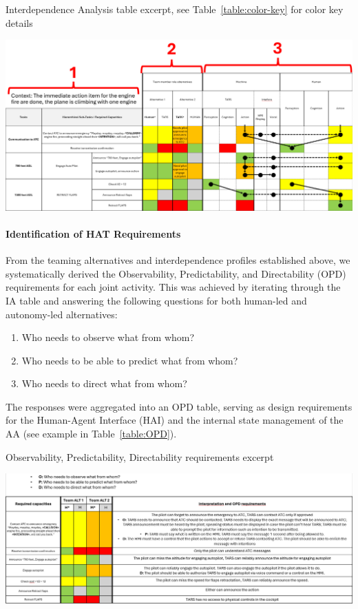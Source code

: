 \documentclass[12pt,a4paper]{article} %
\begin{document}
	\begin{table}[H]
		\centering
		\caption{Interdependence Analysis table excerpt, see Table~\ref{table:color-key} for color key details}
		\includegraphics[width=1\textwidth]{images/IA-table.png}
		\label{table:IA}
	\end{table}

	\paragraph{Identification of HAT Requirements} From the teaming alternatives and interdependence profiles established above, we systematically derived the Observability, Predictability, and Directability (OPD) requirements for each joint activity. This was achieved by iterating through the IA table and answering the following questions for both human-led and autonomy-led alternatives:
	
	\begin{enumerate}
		\item Who needs to observe what from whom?
		\item Who needs to be able to predict what from whom?
		\item Who needs to direct what from whom?
	\end{enumerate}

	The responses were aggregated into an OPD table, serving as design requirements for the Human-Agent Interface (HAI) and the internal state management of the AA (see example in Table~\ref{table:OPD}).

	\begin{table}[H]
		\centering
		\caption{Observability, Predictability, Directability requirements excerpt}
		\includegraphics[width=1\textwidth]{images/OPD_table.png}
		\label{table:OPD}
	\end{table}
\end{document}
